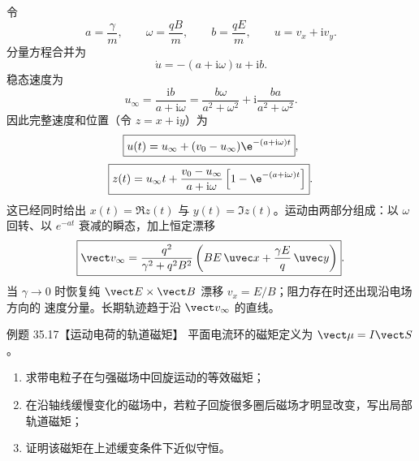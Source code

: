 \begin{xesolution}
令
\[
  a=\frac\gamma m,
  \qquad \omega=\frac{qB}{m},
  \qquad b=\frac{qE}{m},
  \qquad u=v_x+\mathrm i v_y.
\]
分量方程合并为
\begin{equation}
  \dot u=-(a+\mathrm i\omega)u+\mathrm i b.
\end{equation}
稳态速度为
\begin{equation}
  u_\infty=\frac{\mathrm i b}{a+\mathrm i\omega}
  =\frac{b\omega}{a^2+\omega^2}
  +\mathrm i\frac{ba}{a^2+\omega^2}.
\end{equation}
因此完整速度和位置（令 $z=x+\mathrm i y$）为
\begin{equation}
  \boxed{u(t)=u_\infty+(v_0-u_\infty)\e^{-(a+\mathrm i\omega)t}},
\end{equation}
\begin{equation}
  \boxed{z(t)=u_\infty t+
  \frac{v_0-u_\infty}{a+\mathrm i\omega}
  \left[1-\e^{-(a+\mathrm i\omega)t}\right]}.
\end{equation}
这已经同时给出 $x(t)=\Re z(t)$ 与 $y(t)=\Im z(t)$。运动由两部分组成：以
$\omega$ 回转、以 $e^{-at}$ 衰减的瞬态，加上恒定漂移
\begin{equation}
  \boxed{\vect v_\infty=
  \frac{q^2}{\gamma^2+q^2B^2}
  \left(BE\,\uvec x+\frac{\gamma E}{q}\,\uvec y\right)}.
\end{equation}
当 $\gamma\to0$ 时恢复纯 $\vect E\times\vect B$ 漂移 $v_x=E/B$；阻力存在时还出现沿电场方向的
速度分量。长期轨迹趋于沿 $\vect v_\infty$ 的直线。

\dampedDriftDiagram
\end{xesolution}

\Needspace{0.50\textheight}
\begin{origexamplebox}{例题 35.17【运动电荷的轨道磁矩】}
平面电流环的磁矩定义为 $\vect\mu=I\vect S$。
\begin{enumerate}[label=(\arabic*),leftmargin=2.2em]
  \item 求带电粒子在匀强磁场中回旋运动的等效磁矩；
  \item 在沿轴线缓慢变化的磁场中，若粒子回旋很多圈后磁场才明显改变，写出局部轨道磁矩；
  \item 证明该磁矩在上述缓变条件下近似守恒。
\end{enumerate}
\end{origexamplebox}


